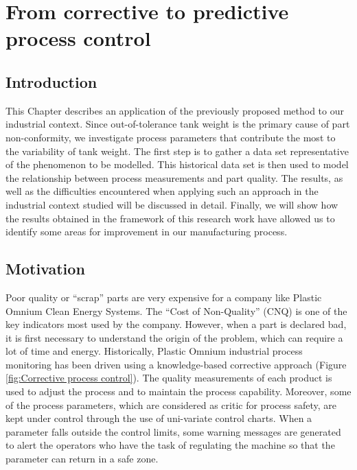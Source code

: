 \chapter{From corrective to predictive process control} \label{From Corrective to Predictive Process Control}
\minitoc

\section{Introduction}

This Chapter describes an application of the previously proposed method to our industrial context. Since out-of-tolerance tank weight is the primary cause of part non-conformity, we investigate process parameters that contribute the most to the variability of tank weight. The first step is to gather a data set representative of the phenomenon to be modelled.  This historical data set is then used to model the relationship between process measurements and part quality. The results, as well as the difficulties encountered when applying such an approach in the industrial context studied will be discussed in detail. Finally, we will show how the results obtained in the framework of this research work have allowed us to identify some areas for improvement in our manufacturing process. 


\section{Motivation}

Poor quality or ``scrap'' parts are very expensive for a company like Plastic Omnium Clean Energy Systems. The “Cost of Non-Quality” (CNQ) is one of the key indicators most used by the company. However, when a part is declared bad, it is first necessary to understand the origin of the problem, which can require a lot of time and energy. Historically, Plastic Omnium industrial process monitoring has been driven using a knowledge-based corrective approach (Figure \ref{fig:Corrective process control}). The quality measurements of each product is used to adjust the process and to maintain the process capability. Moreover, some of the process parameters, which are considered as critic for process safety, are kept under control through the use of uni-variate control charts. When a parameter falls outside the control limits, some warning messages are generated to alert the operators who have the task of regulating the machine so that the parameter can return in a safe zone. 

